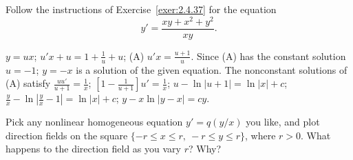 \documentclass{ximera}
\begin{document}
\begin{problem}\label{exer:2.4.38}
Follow the instructions of Exercise~\ref{exer:2.4.37} for the equation
$$
y'=\frac{xy+x^2+y^2}{xy}.
$$



\begin{solution}
    $y=ux$;\;
$u'x+u=1+\frac{1}{ u}+u$;\;
(A) $u'x=\frac{u+1}{ u}$.
Since (A)  has the constant solution $u=-1$;
$y=-x$ is
a solution of the given equation. The nonconstant solutions of (A)
satisfy
$\frac{uu'}{ u+1}=\frac{1}{ x}$;\;
$\left[1-\frac{1 }{ u+1}\right]u'=\frac{1}{ x}$;\;
$u-\ln |u+1|=\ln |x|+c$;\;
$\frac{y}{ x}-\ln\left|\frac{y}{ x}-1\right|=\ln|x|+c$;\;
$y-x\ln|y-x|=cy$.
\end{solution}
\end{problem}

\begin{problem}\label{exer:2.4.39}
Pick any nonlinear homogeneous equation $y'=q(y/x)$  you like, and
plot  direction fields on the square $\{-r\leq x\leq r,\ -r\leq y\leq r\}$,
where $r>0$. What happens to the direction field as you vary $r$?
Why?
\end{problem}
\end{document}
